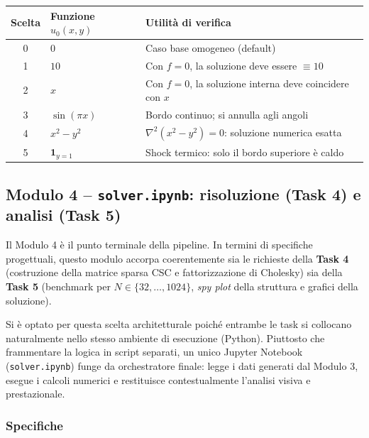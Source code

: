 \documentclass[a4paper,12pt]{article}
\begin{document}
\begin{center}
\begin{tabular}{clp{7cm}}
\toprule
\textbf{Scelta} & \textbf{Funzione $u_0(x,y)$} & \textbf{Utilità di verifica} \\
\midrule
0 & $0$ & Caso base omogeneo (default) \\
1 & $10$ & Con $f=0$, la soluzione deve essere $\equiv 10$ \\
2 & $x$ & Con $f=0$, la soluzione interna deve coincidere con $x$ \\
3 & $\sin(\pi x)$ & Bordo continuo; si annulla agli angoli \\
4 & $x^2 - y^2$ & $\nabla^2(x^2-y^2)=0$: soluzione numerica esatta \\
5 & $\mathbf{1}_{y=1}$ & Shock termico: solo il bordo superiore è caldo \\
\bottomrule
\end{tabular}
\end{center}

\clearpage
\subsection*{Modulo 4 -- \texttt{solver.ipynb}: risoluzione (Task 4) e analisi (Task 5)}

Il Modulo 4 è il punto terminale della pipeline. In termini di specifiche progettuali, questo modulo accorpa coerentemente sia le richieste della \textbf{Task 4} (costruzione della matrice sparsa CSC e fattorizzazione di Cholesky) sia della \textbf{Task 5} (benchmark per $N \in \{32, \dots, 1024\}$, \textit{spy plot} della struttura e grafici della soluzione). 

Si è optato per questa scelta architetturale poiché entrambe le task si collocano naturalmente nello stesso ambiente di esecuzione (Python). Piuttosto che frammentare la logica in script separati, un unico Jupyter Notebook (\texttt{solver.ipynb}) funge da orchestratore finale: legge i dati generati dal Modulo 3, esegue i calcoli numerici e restituisce contestualmente l'analisi visiva e prestazionale.

\subsubsection*{Specifiche}
\end{document}
